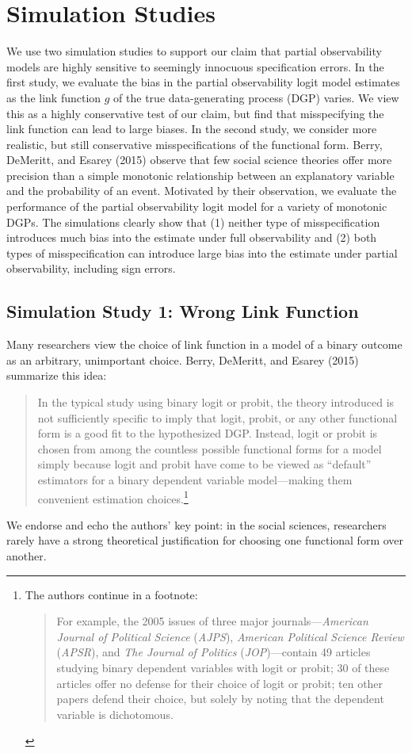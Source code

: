 \documentclass[10pt]{article}
\begin{document}
\section*{Simulation Studies}

We use two simulation studies to support our claim that partial observability models are highly sensitive to seemingly innocuous specification errors. 
In the first study, we evaluate the bias in the partial observability logit model estimates as the link function $g$ of the true data-generating process (DGP) varies. 
We view this as a highly conservative test of our claim, but find that misspecifying the link function can lead to large biases. 
In the second study, we consider more realistic, but still conservative misspecifications of the functional form. 
Berry, DeMeritt, and Esarey (2015) observe that few social science theories offer more precision than a simple monotonic relationship between an explanatory variable and the probability of an event. 
Motivated by their observation, we evaluate the performance of the partial observability logit model for a variety of monotonic DGPs.
The simulations clearly show that (1) neither type of misspecification introduces much bias into the estimate under full observability and (2) both types of misspecification can introduce large bias into the estimate under partial observability, including sign errors.

\subsection*{Simulation Study 1: Wrong Link Function}

Many researchers view the choice of link function in a model of a binary outcome as an arbitrary, unimportant choice. 
Berry, DeMeritt, and Esarey (2015) summarize this idea:
\begin{quote}
In the typical study using binary logit or probit, the theory introduced is not sufficiently specific to imply that logit, probit, or any other functional form is a good fit to the hypothesized DGP. 
Instead, logit or probit is chosen from among the countless possible functional forms for a model simply because logit and probit have come to be viewed as ``default'' estimators for a binary dependent variable model---making them convenient estimation choices.\footnote{The authors continue in a footnote:
\begin{quote}
For example, the 2005 issues of three major journals---\textit{American Journal of Political Science} (\textit{AJPS}), \textit{American Political Science Review} (\textit{APSR}), and \textit{The Journal of Politics} (\textit{JOP})---contain 49 articles studying binary dependent variables with logit or probit; 30 of these articles offer no defense for their choice of logit or probit; ten other papers defend their choice, but solely by noting that the dependent variable is dichotomous. 
\end{quote}}
\end{quote}
We endorse and echo the authors' key point: in the social sciences, researchers rarely have a strong theoretical justification for choosing one functional form over another. 
\end{document}
